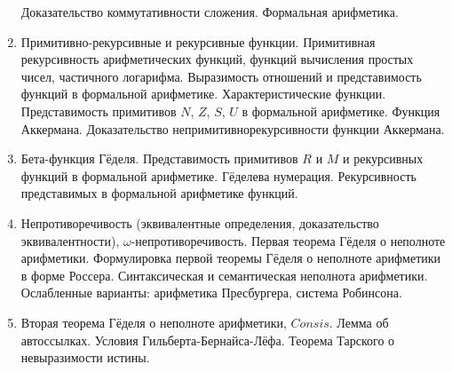 \documentclass[11pt,a4paper,oneside]{scrartcl}
\begin{document}
\begin{enumerate}
Доказательство коммутативности сложения. Формальная арифметика. 
\item Примитивно-рекурсивные и рекурсивные функции. Примитивная рекурсивность 
арифметических функций, функций вычисления простых чисел, частичного логарифма.
Выразимость отношений и представимость функций в формальной арифметике. Характеристические функции.
Представимость примитивов $N$, $Z$, $S$, $U$ в формальной арифметике.
Функция Аккермана. Доказательство непримитивнорекурсивности функции Аккермана.
\item Бета-функция Гёделя. Представимость примитивов $R$ и $M$ и рекурсивных функций в формальной арифметике.
Гёделева нумерация. Рекурсивность представимых в формальной арифметике функций.
\item Непротиворечивость (эквивалентные определения, доказательство эквивалентности), $\omega$-не\-про\-ти\-во\-речивость. 
Первая теорема Гёделя о неполноте арифметики.
Формулировка первой теоремы Гёделя о неполноте арифметики в форме Россера. Синтаксическая и семантическая неполнота арифметики.
Ослабленные варианты: арифметика Пресбургера, система Робинсона.
\item Вторая теорема Гёделя о неполноте арифметики, $Consis$. 
Лемма об автоссылках. Условия Гильберта-Бернайса-Лёфа. Теорема Тарского о невыразимости истины.
\end{enumerate}
\end{document}
